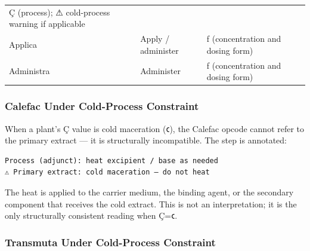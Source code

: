 \documentclass[12pt,a4paper]{article}
\begin{document}
\begin{longtable}[]{@{}lll@{}}
\begin{minipage}[t]{0.30\columnwidth}
Ç (process); ⚠ cold-process warning if applicable\strut
\end{minipage}\tabularnewline
\begin{minipage}[t]{0.30\columnwidth}\raggedright
Applica\strut
\end{minipage} & \begin{minipage}[t]{0.30\columnwidth}\raggedright
Apply / administer\strut
\end{minipage} & \begin{minipage}[t]{0.30\columnwidth}\raggedright
ƒ (concentration and dosing form)\strut
\end{minipage}\tabularnewline
\begin{minipage}[t]{0.30\columnwidth}\raggedright
Administra\strut
\end{minipage} & \begin{minipage}[t]{0.30\columnwidth}\raggedright
Administer\strut
\end{minipage} & \begin{minipage}[t]{0.30\columnwidth}\raggedright
ƒ (concentration and dosing form)\strut
\end{minipage}\tabularnewline
\bottomrule
\end{longtable}

\hypertarget{calefac-under-cold-process-constraint}{%
\subsubsection{Calefac Under Cold-Process
Constraint}\label{calefac-under-cold-process-constraint}}

When a plant's Ç value is cold maceration (𐑤), the Calefac opcode cannot
refer to the primary extract --- it is structurally incompatible. The
step is annotated:

\begin{verbatim}
Process (adjunct): heat excipient / base as needed
⚠ Primary extract: cold maceration — do not heat
\end{verbatim}

The heat is applied to the carrier medium, the binding agent, or the
secondary component that receives the cold extract. This is not an
interpretation; it is the only structurally consistent reading when Ç=𐑤.

\hypertarget{transmuta-under-cold-process-constraint}{%
\subsubsection{Transmuta Under Cold-Process
Constraint}\label{transmuta-under-cold-process-constraint}}
\end{document}
